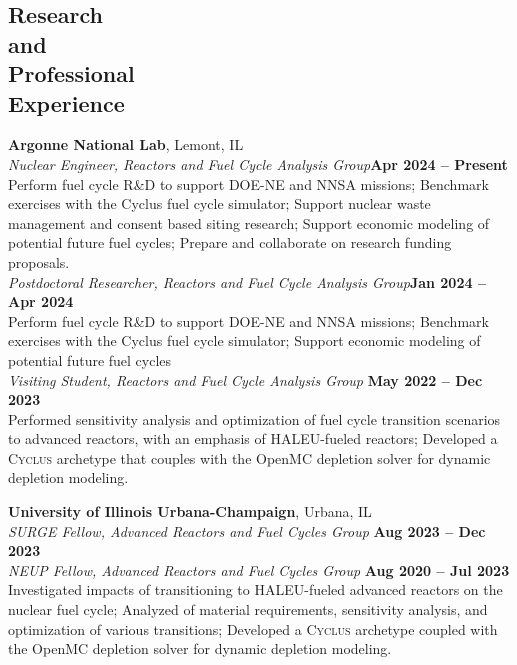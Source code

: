 \documentclass[margin,line]{resume}
\newcommand{\Cyclus}{\textsc{Cyclus}\xspace}%
\begin{document}
\begin{resume}
    \section{\mysidestyle Research\\and\\Professional\\Experience}
    \textbf{Argonne National Lab}, Lemont, IL \vspace{1mm}\\
                \textsl{Nuclear Engineer, Reactors and Fuel Cycle Analysis Group}\hfill \textbf{Apr 2024 -- Present}\\
                Perform fuel cycle R\&D to support DOE-NE and NNSA missions; Benchmark exercises with 
                the Cyclus fuel cycle simulator; Support nuclear waste management and consent based 
                siting research; Support economic modeling of potential future 
                fuel cycles; Prepare and collaborate on research funding proposals. \vspace{2mm}\\                
                \textsl{Postdoctoral Researcher, Reactors and Fuel Cycle Analysis Group}\hfill \textbf{Jan 2024 -- Apr 2024}\\
                Perform fuel cycle R\&D to support DOE-NE and NNSA missions; Benchmark exercises with 
                the Cyclus fuel cycle simulator; Support economic modeling of potential future 
                fuel cycles\vspace{2mm}\\                
                \textsl{Visiting Student, Reactors and Fuel Cycle Analysis Group} \hfill \textbf{May 2022 -- Dec 2023}\\
                Performed sensitivity analysis and optimization of fuel cycle 
                transition scenarios to advanced reactors, with an emphasis of HALEU-fueled reactors; 
                Developed a \Cyclus archetype that couples with the OpenMC depletion 
                solver for dynamic depletion modeling. 

    \textbf{University of Illinois Urbana-Champaign}, Urbana, IL  \vspace{1mm}\\
                \textsl{SURGE Fellow, Advanced Reactors and Fuel Cycles Group} \hfill \textbf{Aug 2023 -- Dec 2023}\\
                \textsl{NEUP Fellow, Advanced Reactors and Fuel Cycles Group} \hfill \textbf{Aug 2020 -- Jul 2023}\\
                Investigated impacts of transitioning to HALEU-fueled advanced 
                reactors on the nuclear fuel cycle; Analyzed of material 
                requirements, sensitivity analysis, and optimization 
                of various transitions; Developed a \Cyclus archetype coupled
                with the OpenMC depletion solver for dynamic depletion modeling. 


\end{resume}
\end{document}

